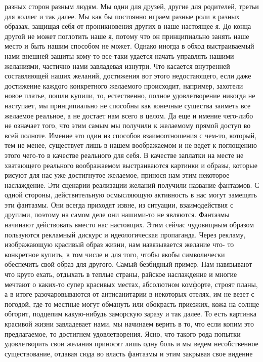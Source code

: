 разных сторон разным людям. Мы одни для друзей, другие для родителей, третьи для
коллег и так далее. Мы как бы постоянно играем разные роли в разных образах,
защищая себя от проникновения других в наше настоящее я. До конца другой не
может поглотить наше я, потому что он принципиально занять наше место и быть
нашим способом не может. Однако иногда в обход выстраиваемый нами внешней защиты
кому-то все-таки удается начать управлять нашими желаниями, частично нами
завладевая изнутри. Что касается внутренней составляющей наших желаний,
достижения вот этого недостающего, если даже достижение каждого конкретного
желаемого происходит, например, захотели новое платье, пошли купили, то,
естественно, полное удовлетворение никогда не наступает, мы принципиально не
способны как конечные существа заиметь все желаемое реальное, а не достает нам
всего в целом. Да еще и имение чего-либо не означает того, что этим самым мы
получили к желаемому прямой доступ во всей полноте. Имение это один из способов
взаимоотношения с чем-то, который, тем не менее, существует лишь в нашем
воображаемом и не ведет к поглощению этого чего-то в качестве реального для
себя. В качестве заплатки на месте не хватающего реального воображаемом
выстраиваются картинки и образы, которые рисуют для нас уже достигнутое
желаемое, принося нам этим некоторое наслаждение. Эти сценарии реализации
желаний получили название фантазмов. С одной стороны, действительную осмысляющую
активность в нас могут замещать эти фантазмы. Они всегда приходят извне, из
ситуации, взаимодействия с другими, поэтому на самом деле они нашими-то не
являются. Фантазмы начинают действовать вместо нас настоящих. Этим сейчас
чудовищным образом пользуются рекламный дискурс и идеологическая пропаганда.
Через рекламу, изображающую красивый образ жизни, нам навязывается желание что-
то конкретное купить, в том числе и для того, чтобы якобы символически
обеспечить свой образ для другого. Самый безбидный пример. Нам навязывают что
круто ехать, отдыхать в теплые страны, райское наслаждение и многие мечтают о
каких-то супер красивых местах, абсолютном комфорте, строят планы, а в итоге
разочаровываются от антисанитарии в некоторых отелях, им не везет с погодой,
где-то местные могут обмануть или обокрасть приезжих, кожа на солнце обгорит,
подцепим какую-нибудь заморскую заразу и так далее. То есть картинка красивой
жизни завладевает нами, мы начинаем верить в то, что если копим это
предлагаемое, то достигнем удовлетворения. Ясно, что такого рода попытки
удовлетворить свои желания приносят лишь одну боль и мы ведем несобственное
существование, отдавая сюда во власть фантазмы и этим закрывая свое видение
